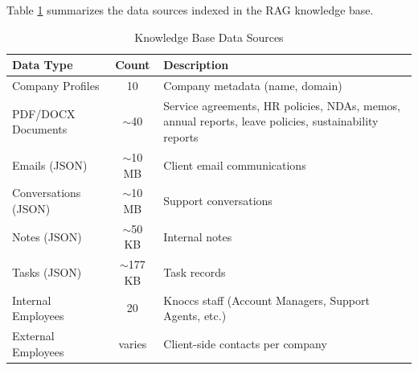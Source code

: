 Table \ref{tab:kb_composition} summarizes the data sources indexed in the RAG knowledge base.

\begin{table}[H]
\centering
\caption{Knowledge Base Data Sources}
\label{tab:kb_composition}
\begin{tabular}{|l|c|p{7cm}|}
\hline
\textbf{Data Type} & \textbf{Count} & \textbf{Description} \\ \hline
Company Profiles & 10 & Company metadata (name, domain) \\ \hline
PDF/DOCX Documents & $\sim$40 & Service agreements, HR policies, NDAs, memos, annual reports, leave policies, sustainability reports \\ \hline
Emails (JSON) & $\sim$10 MB & Client email communications \\ \hline
Conversations (JSON) & $\sim$10 MB & Support conversations \\ \hline
Notes (JSON) & $\sim$50 KB & Internal notes \\ \hline
Tasks (JSON) & $\sim$177 KB & Task records \\ \hline
Internal Employees & 20 & Knoccs staff (Account Managers, Support Agents, etc.) \\ \hline
External Employees & varies & Client-side contacts per company \\ \hline
\end{tabular}
\end{table}
